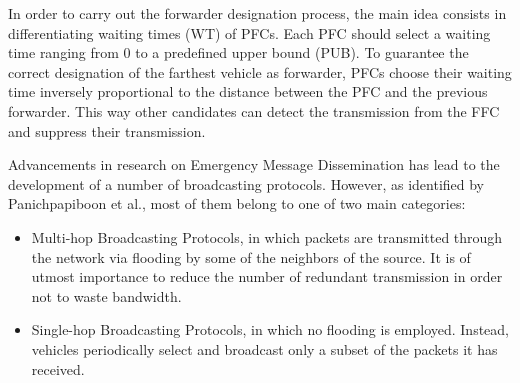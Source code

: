 		
		In order to carry out the forwarder designation process, the main idea consists in differentiating waiting times (WT) of PFCs. Each PFC should select a waiting time ranging from 0 to a predefined upper bound (PUB). To guarantee the correct designation of the farthest vehicle as forwarder, PFCs choose their waiting time inversely proportional to the distance between the PFC and the previous forwarder. This way other candidates can detect the transmission from the FFC and suppress their transmission.
		
		Advancements in research on Emergency Message Dissemination has lead to the development of a number of broadcasting protocols. However, as identified by Panichpapiboon et al.\cite{5989903}, most of them belong to one of two main categories:
		\begin{itemize}
			\item Multi-hop Broadcasting Protocols, in which packets are transmitted through the network via flooding by some of the neighbors of the source. It is of utmost importance to reduce the number of redundant transmission in order not to waste bandwidth.
			\item Single-hop Broadcasting Protocols, in which no flooding is employed. Instead, vehicles periodically select and broadcast only a subset of the packets it has received.
		\end{itemize}
		
